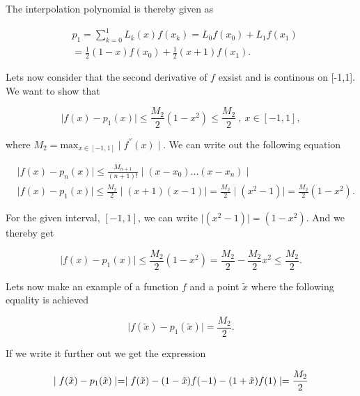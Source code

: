 The interpolation polynomial is thereby given as

\begin{equation}
\label{eq: interpolation poly}
\begin{split}
& p_{1}=\sum\limits_{k=0}^1 L_{k}(x)f(x_{k})=L_{0}f(x_{0})+L_{1}f(x_{1})\\
&=\frac{1}{2}(1-x)f(x_{0})+\frac{1}{2}(x+1)f(x_{1}).
\end{split}
\end{equation}

Lets now consider that the second derivative of $f$ exsist and is continous on [-1,1]. We want to show that

\begin{equation}
\label{eq: ineq Lagrange}
\mid f(x)-p_{1}(x)\mid \leq \frac{M_{2}}{2}(1-x^{2})\leq\frac{M_{2}}{2} \: , \: x\in[-1,1] ,
\end{equation}

where $M_{2}=\text{max}_{x\in[-1,1]} \mid f^{''}(x)\mid$. We can write out the following equation \footnotemark

\begin{equation}
\label{eq: Ineq Lagrange 2}
\begin{split}
&\mid f(x)-p_{n}(x)\mid \leq \frac{M_{n+1}}{(n+1)!}\mid(x-x_0)\ldots(x-x_n)\mid\  \\
&\mid f(x)-p_{1}(x)\mid \leq \frac{M_2}{2}\mid(x+1)(x-1)\mid =\frac{M_2}{2}\mid(x^2-1)\mid = \frac{M_2}{2}(1-x^2).
\end{split}
\end{equation}

For the given interval, $[-1,1]$, we can write $\mid (x^2-1) \mid = (1-x^2)$. And we thereby get

\begin{equation}
\label{eq: Ineq Lagrange 3}
\mid f(x)-p_{1}(x)\mid \leq \frac{M_{2}}{2}(1-x^{2}) = \frac{M_{2}}{2} -\frac{M_{2}}{2}x^{2} \leq \frac{M_{2}}{2}.
\end{equation}

Lets now make an example of a function $f$ and a point $\tilde{x}$ where the following equality is achieved

\begin{equation}
\label{eq: equal Lagrange 1}
\mid f(\tilde{x})-p_{1}(\tilde{x}) \mid = \frac{M_2}{2}.
\end{equation}

If we write it further out we get the expression

\begin{equation}
\label{eq: equal Lagrange 2}
\mid f(\tilde{x})-p_{1}(\tilde{x}) \mid = \mid f(\tilde{x}) - (1-\tilde{x})f(-1) - (1+\tilde{x})f(1) \mid = \frac{M_2}{2}\\
\end{equation}

